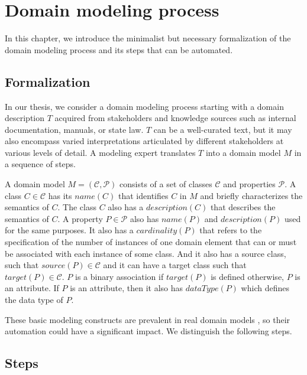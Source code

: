 \chapter{Domain modeling process}
\label{chap:domain_modeling_process}

In this chapter, we introduce the minimalist but necessary formalization of the domain modeling process and its steps that can be automated.


\section{Formalization}

In our thesis, we consider a domain modeling process starting with a domain description $T$ acquired from stakeholders and knowledge sources such as internal documentation, manuals, or state law. $T$ can be a well-curated text, but it may also encompass varied interpretations articulated by different stakeholders at various levels of detail. A modeling expert translates $T$ into a domain model $M$ in a sequence of steps.

A domain model $M = (\mathcal{C}, \mathcal{P})$ consists of a set of classes $\mathcal{C}$ and properties $\mathcal{P}$. A class $C \in \mathcal{C}$ has its $name(C)$ that identifies $C$ in $M$ and briefly characterizes the semantics of $C$. The class $C$ also has a $description(C)$ that describes the semantics of $C$. A property $P \in \mathcal{P}$ also has $name(P)$ and $description(P)$ used for the same purposes. It also has a $cardinality(P)$ that refers to the specification of the number of instances of one domain element that can or must be associated with each instance of some class. And it also has a source class, such that $source(P) \in \mathcal{C}$ and it can have a target class such that $target(P) \in \mathcal{C}$. $P$ is a binary association if $target(P)$ is defined otherwise, $P$ is an attribute. If $P$ is an attribute, then it also has $dataType(P)$ which defines the data type of $P$.

These basic modeling constructs are prevalent in real domain models \cite{Keet2015}, so their automation could have a significant impact. We distinguish the following steps.


\section{Steps}
\label{sec:modeling_steps}


